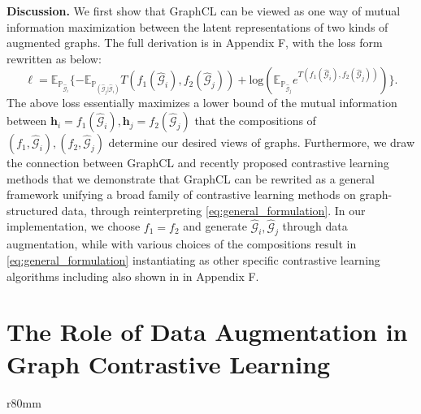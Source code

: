 \textbf{Discussion.}
We first show that GraphCL can be viewed as one way of mutual information maximization between the latent representations of two kinds of augmented graphs. The full derivation is in Appendix F, with the loss form rewritten as below:
\begin{equation} \label{eq:general_formulation}
    \ell = \mathbb{E}_{\mathbb{P}_{\hat{\mathcal{G}}_i}} \{ - \mathbb{E}_{\mathbb{P}_{(\hat{\mathcal{G}}_j | \hat{\mathcal{G}}_i)}} T(f_1(\hat{\mathcal{G}}_i), f_2(\hat{\mathcal{G}}_j)) +  \mathrm{log} (\mathbb{E}_{\mathbb{P}_{\hat{\mathcal{G}}_j}} e^{T(f_1(\hat{\mathcal{G}}_i), f_2(\hat{\mathcal{G}}_j))}) \}.
\end{equation}
The above loss essentially maximizes a lower bound of the mutual information between $\boldsymbol{h}_i = f_1(\hat{\mathcal{G}}_i), \boldsymbol{h}_j = f_2(\hat{\mathcal{G}}_j)$ that the compositions of $(f_1, \hat{\mathcal{G}}_i), (f_2, \hat{\mathcal{G}}_j)$ determine our desired views of graphs.
Furthermore, we draw the connection between GraphCL and recently proposed contrastive learning methods that we demonstrate that GraphCL can be rewrited as a general framework unifying a broad family of contrastive learning methods on graph-structured data, through reinterpreting \eqref{eq:general_formulation}.
In our implementation, we choose $f_1 = f_2$ and generate $\hat{\mathcal{G}}_i, \hat{\mathcal{G}}_j$ through data augmentation, while with various choices of the compositions result in \eqref{eq:general_formulation} instantiating as other specific contrastive learning algorithms including \cite{velickovic2019deep,ren2019heterogeneous,park2020unsupervised,sun2019infograph,peng2020graph,hassani2020contrastive,qiu2020gcc} also shown in in Appendix F.

\section{The Role of Data Augmentation in Graph Contrastive Learning}\label{sec:aug}

\begin{wraptable}{r}{80mm}
\vspace{-1em}
\small
 \caption{\small{Datasets statistics.}}
 \label{tab:statistics}
 \centering
\end{wraptable}

